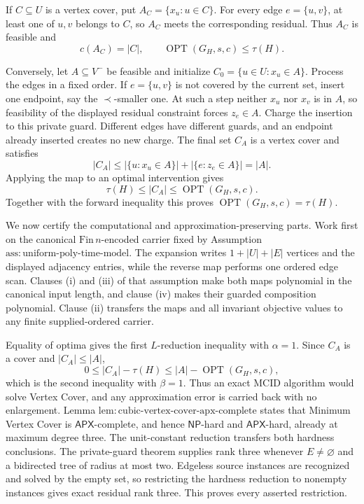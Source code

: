 If \(C\subseteq U\) is a vertex cover, put
\(A_C=\{x_u:u\in C\}\).  For every edge \(e=\{u,v\}\), at least one of
\(u,v\) belongs to \(C\), so \(A_C\) meets the corresponding residual.
Thus \(A_C\) is feasible and
\[
 c(A_C)=|C|,
 \qquad
 \operatorname{OPT}(G_H,s,c)\leq\tau(H).
\]

Conversely, let \(A\subseteq V^{-}\) be feasible and initialize
\(C_0=\{u\in U:x_u\in A\}\).  Process the edges in a fixed order.  If
\(e=\{u,v\}\) is not covered by the current set, insert one endpoint, say
the \(\prec\)-smaller one.  At such a step neither \(x_u\) nor \(x_v\)
is in \(A\), so feasibility of the displayed residual constraint forces
\(z_e\in A\).  Charge the insertion to this private guard.  Different
edges have different guards, and an endpoint already inserted creates no
new charge.  The final set \(C_A\) is a vertex cover and satisfies
\[
 |C_A|
 \leq |\{u:x_u\in A\}|+|\{e:z_e\in A\}|
 =|A|.
\]
Applying the map to an optimal intervention gives
\[
 \tau(H)\leq |C_A|\leq\operatorname{OPT}(G_H,s,c).
\]
Together with the forward inequality this proves
\(\operatorname{OPT}(G_H,s,c)=\tau(H)\).

We now certify the computational and approximation-preserving parts.  Work
first on the canonical \(\mathrm{Fin}\,n\)-encoded carrier fixed by
Assumption \(\mathrm{ass{:}uniform\mbox{-}poly\mbox{-}time\mbox{-}model}\).
The expansion writes \(1+|U|+|E|\) vertices and the displayed adjacency
entries, while the reverse map performs one ordered edge scan.  Clauses
(i) and (iii) of that assumption make both maps polynomial in the canonical
input length, and clause (iv) makes their guarded composition polynomial.
Clause (ii) transfers the maps and all invariant objective values to any
finite supplied-ordered carrier.

Equality of optima gives the first \(L\)-reduction inequality with
\(\alpha=1\).  Since \(C_A\) is a cover and \(|C_A|\leq|A|\),
\[
 0\leq |C_A|-\tau(H)
 \leq |A|-\operatorname{OPT}(G_H,s,c),
\]
which is the second inequality with \(\beta=1\).  Thus an exact MCID
algorithm would solve Vertex Cover, and any approximation error is carried
back with no enlargement.  Lemma
\(\mathrm{lem{:}cubic\mbox{-}vertex\mbox{-}cover\mbox{-}apx\mbox{-}complete}\)
states that Minimum Vertex Cover is \(\mathsf{APX}\)-complete, and hence
\(\mathsf{NP}\)-hard and \(\mathsf{APX}\)-hard, already at maximum degree
three.  The unit-constant reduction transfers both hardness conclusions.
The private-guard theorem supplies rank three whenever \(E\neq\varnothing\)
and a bidirected tree of radius at most two.  Edgeless source instances are
recognized and solved by the empty set, so restricting the hardness
reduction to nonempty instances gives exact residual rank three.  This
proves every asserted restriction.

